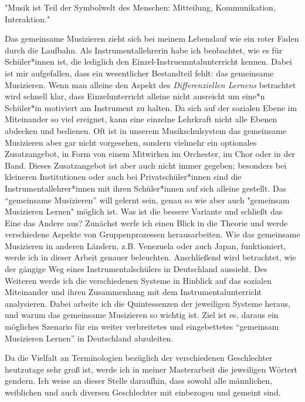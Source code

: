 
"Musik ist Teil der Symbolwelt des Menschen: Mitteilung, Kommunikation,
Interaktion." \autocite[91]{doerne:umfassend_musizieren}

Das gemeinsame Musizieren zieht sich bei meinem Lebenslauf wie ein roter Faden
durch die Laufbahn. Als Instrumentallehrerin habe ich beobachtet, wie es für
Schüler*innen ist, die lediglich den Einzel-Instruemntalunterricht kennen. Dabei
ist mir aufgefallen, dass ein wesentlicher Bestandteil fehlt: das gemeinsame
Musizieren. Wenn man alleine den Aspekt des \emph{Differenziellen Lernens}
betrachtet wird schnell klar, dass Einzelunterricht alleine nicht ausreicht um
eine*n Schüler*in motiviert am Instrument zu halten. Da sich auf der sozialen
Ebene im Miteinander so viel ereignet, kann eine einzelne Lehrkraft nicht alle
Ebenen abdecken und bedienen. Oft ist in unserem Musikschulsystem das gemeinsame
Musizieren aber gar nicht vorgesehen, sondern vielmehr ein optionales
Zusatzangebot, in Form von einem Mitwirken im Orchester, im Chor oder in der
Band. Dieses Zusatzangebot ist aber auch nicht immer gegeben; besonders bei
kleineren Institutionen oder auch bei Privatschüler*innen sind die
Instrumentallehrer*innen mit ihren Schüler*innen auf sich alleine gestellt. Das
\enquote{gemeinsame Musizieren} will gelernt sein, genau so wie aber auch
"gemeinsam Musizieren Lernen" möglich ist. Was ist die bessere Variante und
schließt das Eine das Andere aus? Zunächst werfe ich einen Blick in die Theorie
und werde verschiedene Aspekte von Gruppenprozessen herausarbeiten. Wie das
gemeinsame Musizieren in anderen Ländern, z.B. Venezuela oder auch Japan,
funktioniert, werde ich in dieser Arbeit genauer beleuchten. Anschließend wird
betrachtet, wie der gängige Weg eines Instrumentalschülers in Deutschland
aussieht. Des Weiteren werde ich die verschiedenen Systeme in Hinblick auf das
sozialen Miteinander und ihren Zusammenhang mit dem Instrumentalunterricht
analysieren. Dabei arbeite ich die Quintessenzen der jeweiligen Systeme heraus,
und warum das gemeinsame Musizieren so wichtig ist. Ziel ist es, daraus ein
mögliches Szenario für ein weiter verbreitetes und eingebettetes
\enquote{gemeinsam Musizieren Lernen} in Deutschland abzuleiten.


Da die Vielfalt an Terminologien bezüglich der verschiedenen Geschlechter
heutzutage sehr groß ist, werde ich in meiner Masterarbeit die jeweiligen
Wörtert gendern. Ich weise an dieser Stelle daraufhin, dass sowohl alle
männlichen, weiblichen und auch diversen Geschlechter mit einbezogen und gemeint
sind. 
